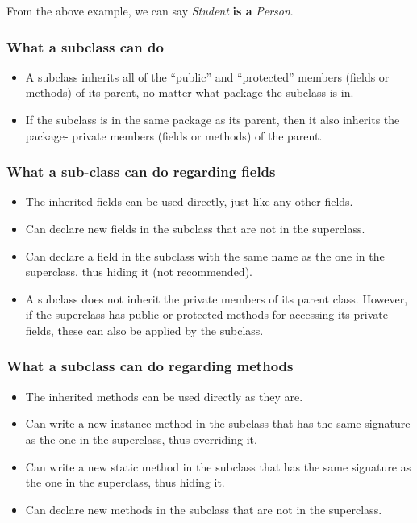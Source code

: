 \documentclass[11pt,a4paper]{article}
\begin{document}
 From the above example, we can say \emph{Student} \textbf{is a} \emph{Person}.
 \subsubsection*{What a subclass can do}
 \begin{itemize}
  \item  A subclass inherits all of the “public” and “protected” members (fields or methods) of
its parent, no matter what package the subclass is in.
  \item If the subclass is in the same package as its parent, then it also inherits the package-
private members (fields or methods) of the parent.

 \end{itemize}
 
\subsubsection*{What a sub-class can do regarding fields}
\begin{itemize}
\item The inherited fields can be used directly, just like any other fields.
\item Can declare new fields in the subclass that are not in the superclass.
\item Can declare a field in the subclass with the same name as the one in the superclass, thus hiding it (not recommended).
\item A subclass does not inherit the private members of its parent class. However, if the superclass has public or protected methods for accessing its private fields, these can also be applied by the subclass.
\end{itemize}

\subsubsection*{What a subclass can do regarding methods}
\begin{itemize}
\item The inherited methods can be used directly as they are.
\item Can write a new instance method in the subclass that has the same signature as the one in the superclass, thus overriding it.
\item Can write a new static method in the subclass that has the same signature as the one in the superclass, thus hiding it.
\item Can declare new methods in the subclass that are not in the superclass.
\end{itemize}
\end{document}
